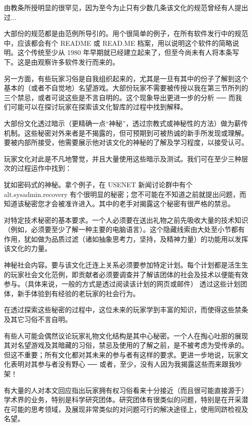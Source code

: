 由教条所授明显的很罕见，因为至今为止只有少数几条该文化的规范曾经有人提出过...

大部份的规范都是由范例所导引的。用个很简单的例子，在所有软件发行中的规范中，应该都会有个 README 或 READ.ME 档案，用以说明这个软件的简略说明。这个传统至少从 1980 年早期就已经建立起来了，但至今尚未有人将本条写下。这是由观察许多软件发行而来的。

另一方面，有些玩家习俗是自我组织起来的，尤其是一旦有其中的份子了解到这个基本的（或者不自觉地）名望游戏。大部份玩家不需要被传授以我在第三节所列的三个禁忌，或者可说这些是不言自明的。这个现象导出更进一步的分析  ──  而我们可能可以在探讨玩家在探索该文化智库的过程中找到解释。

大部份文化透过暗示（更精确一点“神秘”，透过宗教式或神秘性的方法）做为薪传机制。这些秘密对外来者是不揭露的，但可预期到可被热诚的新手所发现或理解。要被内部所接受，他需要展示他对该文化的神秘的了解及学习程度，以接受认可。

玩家文化对此是不凡地警觉，并且大量使用这些暗示及测试。我们可在至少三种层次的过程运作中找到：

犹如密码式的神秘。拿个例子，在 USENET 新闻讨论群中有个 alt.sysadmin.recovery 有个很明显的秘密；您不可能在不知道之前就提出问题，而知道该秘密您才会被准许进入。其中的老手对揭露这个秘密有很严格的禁忌。

对特定技术秘密的基本要求。一个人必须要在送出礼物之前先吸收大量的技术知识（例如，必须要至少了解一种主要的电脑语言）。这个隐藏线索由大处至小节都有作用，犹如做为品质过滤（诸如抽象思考力，坚持，及精神力量）的功能用以发挥该文化的力量。

神秘社会内容。要与该文化迁连上关系必须要参加特定计划。每个计划都是活生生的玩家社会文化范例，即贡献者必须要调查并了解该团体的社会及技术以便能有效参与。（具体来说，一般的方式是透过阅读该计划的网页或邮件） 透过这些计划团体，新手体验到有经验的老玩家的社会行为。

在透过探索这些秘密的过程中，这位未来的玩家学到丰富的知识，而使得这些禁条及其它习俗不言自明。

有些人可能会偶然议论玩家礼物文化结构是其中心秘密。一个人在掏心吐胆的展现其对名望游戏及其暗藏的习俗，禁忌及使用的了解之前，是不被考虑为受传承的。但这不重要；所有文化都对其未来的参与者有这样的要求。更进一步地说，玩家文化表明对其参与者没有野心  ──  或者，至少，没有人因为我揭露这些而来跟我吵架！

有大量的人对本文回应指出玩家拥有权习俗看来十分接近（而且很可能直接源于）学术界的业务，特别是科学研究团体。研究团体有很类似的问题，特别是在开采潜在可能的思考领域，及展现非常类似的对问题可行的解决途径上，使用同跻检视及名望。

